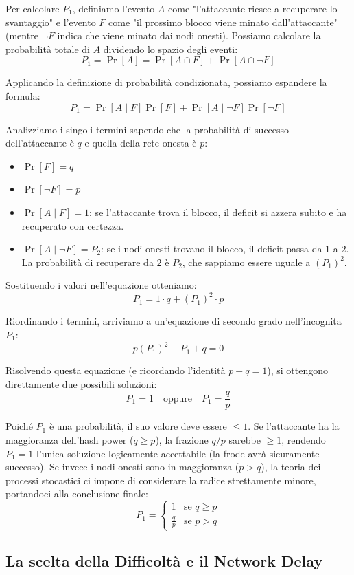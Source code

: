 Per calcolare $P_1$, definiamo l'evento $A$ come "l'attaccante riesce a recuperare lo svantaggio" e l'evento $F$ come "il prossimo blocco viene minato dall'attaccante" (mentre $\neg F$ indica che viene minato dai nodi onesti).
Possiamo calcolare la probabilità totale di $A$ dividendo lo spazio degli eventi:
$$P_1 = \Pr[A] = \Pr[A \cap F] + \Pr[A \cap \neg F]$$

Applicando la definizione di probabilità condizionata, possiamo espandere la formula:
$$P_1 = \Pr[A \mid F]\Pr[F] + \Pr[A \mid \neg F]\Pr[\neg F]$$

Analizziamo i singoli termini sapendo che la probabilità di successo dell'attaccante è $q$ e quella della rete onesta è $p$:
\begin{itemize}
    \item $\Pr[F] = q$
    \item $\Pr[\neg F] = p$
    \item $\Pr[A \mid F] = 1$: se l'attaccante trova il blocco, il deficit si azzera subito e ha recuperato con certezza.
    \item $\Pr[A \mid \neg F] = P_2$: se i nodi onesti trovano il blocco, il deficit passa da $1$ a $2$. La probabilità di recuperare da $2$ è $P_2$, che sappiamo essere uguale a $(P_1)^2$.
\end{itemize}

Sostituendo i valori nell'equazione otteniamo:
$$P_1 = 1 \cdot q + (P_1)^2 \cdot p$$

Riordinando i termini, arriviamo a un'equazione di secondo grado nell'incognita $P_1$:
$$p(P_1)^2 - P_1 + q = 0$$

Risolvendo questa equazione (e ricordando l'identità $p + q = 1$), si ottengono direttamente due possibili soluzioni:
$$P_1 = 1 \quad \text{oppure} \quad P_1 = \frac{q}{p}$$

Poiché $P_1$ è una probabilità, il suo valore deve essere $\le 1$. 
Se l'attaccante ha la maggioranza dell'hash power ($q \ge p$), la frazione $q/p$ sarebbe $\ge 1$, rendendo $P_1 = 1$ l'unica soluzione logicamente accettabile (la frode avrà sicuramente successo).
Se invece i nodi onesti sono in maggioranza ($p > q$), la teoria dei processi stocastici ci impone di considerare la radice strettamente minore, portandoci alla conclusione finale:
$$
P_1 = 
\begin{cases} 
1 & \text{se } q \ge p \\
\frac{q}{p} & \text{se } p > q 
\end{cases}
$$
\subsection{La scelta della Difficoltà e il Network Delay}

